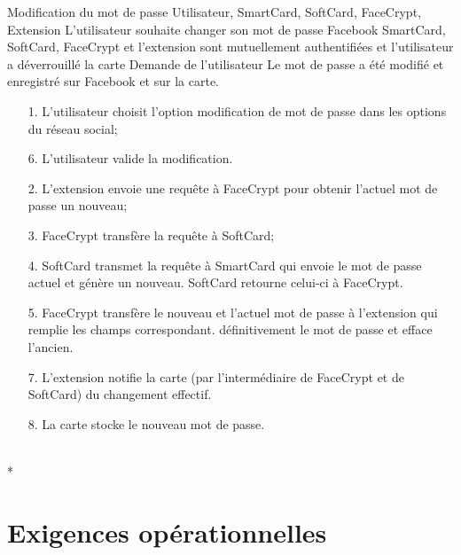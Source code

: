\documentclass[a4paper,11pt,french]{article}
\begin{document}
\fiche
{Modification du mot de passe}
	{Utilisateur, SmartCard, SoftCard, FaceCrypt, Extension}
    {L'utilisateur souhaite changer son mot de passe Facebook}
    {SmartCard, SoftCard, FaceCrypt et l'extension sont mutuellement 
        authentifiées et l'utilisateur a déverrouillé la carte}
    {Demande de l'utilisateur}
    {Le mot de passe a été modifié et enregistré sur Facebook et sur la carte.}
    {\begin{itemize}
        \item[]
        \item[1.] L'utilisateur choisit l'option modification de mot de passe
        dans les options du réseau social;
        \item[6.] L'utilisateur valide la modification.
    \end{itemize}}
	{\begin{itemize}
        \item[]
        \item[2.] L'extension envoie une requête à FaceCrypt pour obtenir
        l'actuel mot de passe un nouveau;
        \item[3.] FaceCrypt transfère la requête à SoftCard;
        \item[4.] SoftCard transmet la requête à SmartCard qui envoie le mot
            de passe actuel et génère un nouveau. SoftCard retourne celui-ci 
            à FaceCrypt.
        \item[5.] FaceCrypt transfère le nouveau et l'actuel  mot de passe à 
        l'extension qui remplie les champs correspondant.
            définitivement le mot de passe et efface l'ancien.
        \item[7.] L'extension notifie la carte (par l'intermédiaire de FaceCrypt
            et de SoftCard) du changement effectif.
        \item[8.] La carte stocke le nouveau mot de passe.
	\end{itemize}
	}
	{}
\flots
    {}
    {}
\\*


\section{Exigences opérationnelles}

\end{document}
